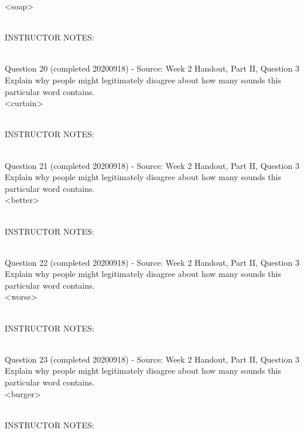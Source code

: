 \documentclass[12pt]{article}
\begin{document}
<soap>


~\\
INSTRUCTOR NOTES: 


~\\

{\large Question 20} (completed 20200918) - Source: Week 2 Handout, Part II, Question 3\\

Explain why people might legitimately disagree about how many sounds this particular word contains.\\

<curtain>


~\\
INSTRUCTOR NOTES: 


~\\

{\large Question 21} (completed 20200918) - Source: Week 2 Handout, Part II, Question 3\\

Explain why people might legitimately disagree about how many sounds this particular word contains.\\

<better>


~\\
INSTRUCTOR NOTES: 


~\\

{\large Question 22} (completed 20200918) - Source: Week 2 Handout, Part II, Question 3\\

Explain why people might legitimately disagree about how many sounds this particular word contains.\\

<worse>


~\\
INSTRUCTOR NOTES: 


~\\

{\large Question 23} (completed 20200918) - Source: Week 2 Handout, Part II, Question 3\\

Explain why people might legitimately disagree about how many sounds this particular word contains.\\

<burger>


~\\
INSTRUCTOR NOTES: 


~\\
\end{document}
